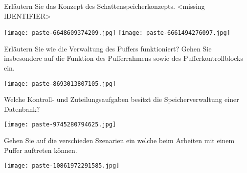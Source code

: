 \documentclass{article}
\begin{document}
\begin{tcolorbox}[colback=white!10!white,colframe=lightgray!75!black,
  savelowerto=\jobname_ex.tex]

\begin{center}
 Erläutern Sie das Konzept des 
Schattenspeicherkonzepts.
 <missing IDENTIFIER>

\end{center}

\tcblower

\justifying
\texttt{[image: paste-6648609374209.jpg]}
\texttt{[image: paste-6661494276097.jpg]}

\end{tcolorbox}
\begin{tcolorbox}[colback=white!10!white,colframe=lightgray!75!black,
  savelowerto=\jobname_ex.tex]

\begin{center}
 Erläutern Sie wie die Verwaltung des Puffers funktioniert? Gehen Sie insbesondere auf die Funktion des Pufferrahmens sowie des Pufferkontrollblocks ein. 

\end{center}

\tcblower

\justifying
\texttt{[image: paste-8693013807105.jpg]}

\end{tcolorbox}
\begin{tcolorbox}[colback=white!10!white,colframe=lightgray!75!black,
  savelowerto=\jobname_ex.tex]

\begin{center}
 Welche Kontroll- und Zuteilungsaufgaben besitzt die Speicherverwaltung einer Datenbank? 

\end{center}

\tcblower

\justifying
\texttt{[image: paste-9745280794625.jpg]}

\end{tcolorbox}
\begin{tcolorbox}[colback=white!10!white,colframe=lightgray!75!black,
  savelowerto=\jobname_ex.tex]

\begin{center}
 Gehen Sie auf die verschieden Szenarien ein welche beim Arbeiten mit einem Puffer auftreten können. 

\end{center}

\tcblower

\justifying
\texttt{[image: paste-10861972291585.jpg]}

\end{tcolorbox}
\end{document}
